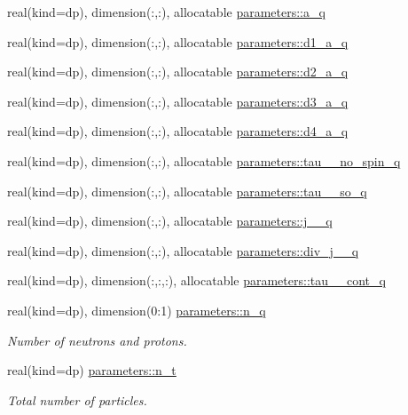 \begin{DoxyCompactItemize}
\item 
real(kind=dp), dimension(\+:,\+:), allocatable \mbox{\hyperlink{namespaceparameters_a537af93b5aaa713688d624f145ebde80}{parameters\+::a\+\_\+q}}
\item 
real(kind=dp), dimension(\+:,\+:), allocatable \mbox{\hyperlink{namespaceparameters_aaeb8117f8c15d7a7414e15929e12b0a8}{parameters\+::d1\+\_\+a\+\_\+q}}
\item 
real(kind=dp), dimension(\+:,\+:), allocatable \mbox{\hyperlink{namespaceparameters_ab2833e12dbfca51501df8955b00dd7d0}{parameters\+::d2\+\_\+a\+\_\+q}}
\item 
real(kind=dp), dimension(\+:,\+:), allocatable \mbox{\hyperlink{namespaceparameters_a1449283e577e2769bd8bb5d57dbf1876}{parameters\+::d3\+\_\+a\+\_\+q}}
\item 
real(kind=dp), dimension(\+:,\+:), allocatable \mbox{\hyperlink{namespaceparameters_a68e56fd9914d22072aed5a180c5a17b2}{parameters\+::d4\+\_\+a\+\_\+q}}
\item 
real(kind=dp), dimension(\+:,\+:), allocatable \mbox{\hyperlink{namespaceparameters_a6722d1e0c27f2796d4e43405bd9c9d81}{parameters\+::tau\+\_\+\_\+no\+\_\+spin\+\_\+q}}
\item 
real(kind=dp), dimension(\+:,\+:), allocatable \mbox{\hyperlink{namespaceparameters_a6f95c2f318204d32f47cefa370021fe4}{parameters\+::tau\+\_\+\_\+so\+\_\+q}}
\item 
real(kind=dp), dimension(\+:,\+:), allocatable \mbox{\hyperlink{namespaceparameters_a41689cc1fc405b2fd02236c39ee5528c}{parameters\+::j\+\_\+\_\+q}}
\item 
real(kind=dp), dimension(\+:,\+:), allocatable \mbox{\hyperlink{namespaceparameters_ab8757a22096c3d5f05f0bf953b59dff4}{parameters\+::div\+\_\+j\+\_\+\_\+q}}
\item 
real(kind=dp), dimension(\+:,\+:,\+:), allocatable \mbox{\hyperlink{namespaceparameters_a1dd9d0c60fab7b85157b61471151ed92}{parameters\+::tau\+\_\+\_\+cont\+\_\+q}}
\item 
real(kind=dp), dimension(0\+:1) \mbox{\hyperlink{group__WS__PROPERTIES_gace169ff7d198e04f282498a2b0ee2bc1}{parameters\+::n\+\_\+q}}
\begin{DoxyCompactList}\small\item\em Number of neutrons and protons. \end{DoxyCompactList}\item 
real(kind=dp) \mbox{\hyperlink{group__WS__PROPERTIES_ga4ea79549c467085cd4c8b95a09ac205e}{parameters\+::n\+\_\+t}}
\begin{DoxyCompactList}\small\item\em Total number of particles. \end{DoxyCompactList}\item 

\end{DoxyCompactItemize}
